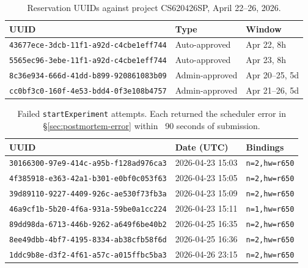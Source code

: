 \documentclass[11pt,a4paper]{article}
\begin{document}
\begin{table}[H]
\centering
\small
\caption{Reservation UUIDs against project CS620426SP, April 22--26, 2026.}
\label{tab:appendix-reservations}
\begin{tabular}{@{}lll@{}}
\toprule
UUID & Type & Window \\
\midrule
\texttt{43677ece-3dcb-11f1-a92d-c4cbe1eff744} & Auto-approved & Apr 22, 8h \\
\texttt{5565ec96-3ebe-11f1-a92d-c4cbe1eff744} & Auto-approved & Apr 23, 8h \\
\texttt{8c36e934-666d-41dd-b899-920861083b09} & Admin-approved & Apr 20--25, 5d \\
\texttt{cc0bf3c0-160f-4e53-bdd4-0f3e108b4757} & Admin-approved & Apr 21--26, 5d \\
\bottomrule
\end{tabular}
\end{table}

\begin{table}[H]
\centering
\small
\caption{Failed \texttt{startExperiment} attempts. Each returned the scheduler error in §\ref{sec:postmortem-error} within ~90 seconds of submission.}
\label{tab:appendix-failed}
\begin{tabular}{@{}lll@{}}
\toprule
UUID & Date (UTC) & Bindings \\
\midrule
\texttt{30166300-97e9-414c-a95b-f128ad976ca3} & 2026-04-23 15:03 & \texttt{n=2,hw=r650} \\
\texttt{4f385918-e363-42a1-b301-e0bf0c053f63} & 2026-04-23 15:05 & \texttt{n=2,hw=r650} \\
\texttt{39d89110-9227-4409-926c-ae530f73fb3a} & 2026-04-23 15:09 & \texttt{n=2,hw=r650} \\
\texttt{46a9cf1b-5b20-4f6a-931a-59be0a1cc224} & 2026-04-23 15:11 & \texttt{n=1,hw=r650} \\
\texttt{89dd98da-6713-446b-9262-a649f6be40b2} & 2026-04-25 16:35 & \texttt{n=2,hw=r650} \\
\texttt{8ee49dbb-4bf7-4195-8334-ab38cfb58f6d} & 2026-04-25 16:36 & \texttt{n=2,hw=r650} \\
\texttt{1ddc9b8e-d3f2-4f61-a57c-a015ffbc5ba3} & 2026-04-26 23:15 & \texttt{n=2,hw=r650} \\
\bottomrule
\end{tabular}
\end{table}
\end{document}
